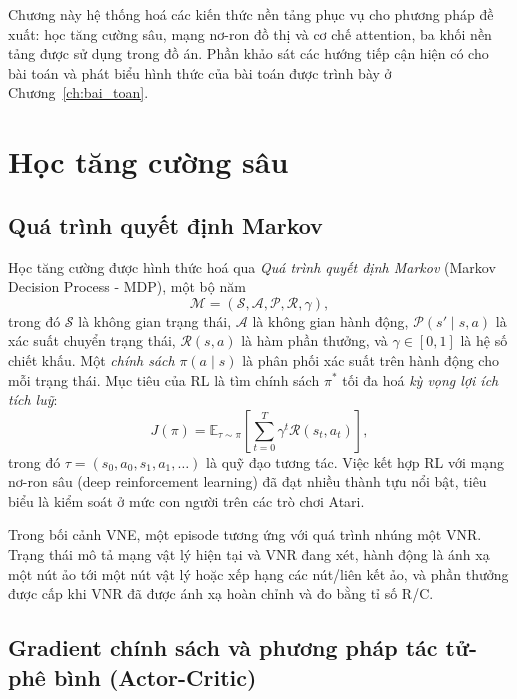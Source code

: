\documentclass[../DoAn.tex]{subfiles}
\begin{document}
\label{ch:nen_tang}

Chương này hệ thống hoá các kiến thức nền tảng phục vụ cho phương pháp đề xuất: học tăng cường sâu, mạng nơ-ron đồ thị và cơ chế attention, ba khối nền tảng được sử dụng trong đồ án. Phần khảo sát các hướng tiếp cận hiện có cho bài toán và phát biểu hình thức của bài toán được trình bày ở Chương~\ref{ch:bai_toan}.

\section{Học tăng cường sâu}
\label{sec:rl}

\subsection{Quá trình quyết định Markov}

Học tăng cường được hình thức hoá qua \textit{Quá trình quyết định Markov} (Markov Decision Process - MDP), một bộ năm
\[
    \mathcal{M} = (\mathcal{S}, \mathcal{A}, \mathcal{P}, \mathcal{R}, \gamma),
\]
trong đó $\mathcal{S}$ là không gian trạng thái, $\mathcal{A}$ là không gian hành động, $\mathcal{P}(s' \mid s, a)$ là xác suất chuyển trạng thái, $\mathcal{R}(s, a)$ là hàm phần thưởng, và $\gamma \in [0, 1]$ là hệ số chiết khấu. Một \textit{chính sách} $\pi(a \mid s)$ là phân phối xác suất trên hành động cho mỗi trạng thái. Mục tiêu của RL là tìm chính sách $\pi^*$ tối đa hoá \textit{kỳ vọng lợi ích tích luỹ}\cite{sutton2018rl}:
\begin{equation}
    J(\pi) = \mathbb{E}_{\tau \sim \pi}\left[ \sum_{t=0}^{T} \gamma^t \mathcal{R}(s_t, a_t) \right],
\end{equation}
trong đó $\tau = (s_0, a_0, s_1, a_1, \ldots)$ là quỹ đạo tương tác. Việc kết hợp RL với mạng nơ-ron sâu (deep reinforcement learning) đã đạt nhiều thành tựu nổi bật, tiêu biểu là kiểm soát ở mức con người trên các trò chơi Atari\cite{mnih2015dqn}.

Trong bối cảnh VNE, một episode tương ứng với quá trình nhúng một VNR. Trạng thái mô tả mạng vật lý hiện tại và VNR đang xét, hành động là ánh xạ một nút ảo tới một nút vật lý hoặc xếp hạng các nút/liên kết ảo, và phần thưởng được cấp khi VNR đã được ánh xạ hoàn chỉnh và đo bằng tỉ số R/C.

\subsection[Gradient chính sách và phương pháp tác tử-phê bình]{Gradient chính sách và phương pháp tác tử-phê bình (Actor-Critic)}
\end{document}
